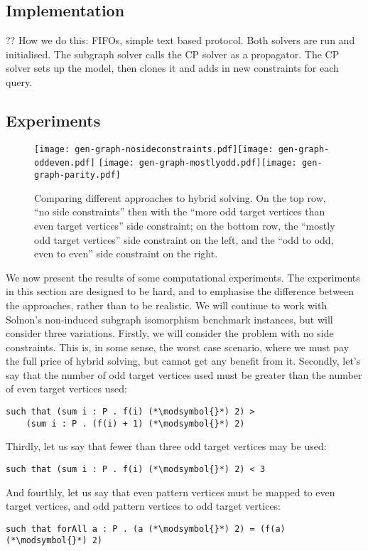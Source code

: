 \documentclass[runningheads]{llncs}
\begin{document}
\subsection{Implementation}

?? How we do this: FIFOs, simple text based protocol. Both solvers are run and initialised. The
subgraph solver calls the CP solver as a propagator. The CP solver sets up the model, then clones it
and adds in new constraints for each query.

\subsection{Experiments}

\begin{figure}[p]
    \texttt{[image: gen-graph-nosideconstraints.pdf]}\hfill\texttt{[image: gen-graph-oddeven.pdf]}
    \bigskip
    \texttt{[image: gen-graph-mostlyodd.pdf]}\hfill\texttt{[image: gen-graph-parity.pdf]}
    \caption{Comparing different approaches to hybrid solving. On the top row, ``no side
    constraints'' then with the ``more odd target vertices than even target vertices'' side
    constraint; on the bottom row, the ``mostly odd target vertices'' side constraint on the left,
    and the ``odd to odd, even to even'' side constraint on the right.}\label{figure:cumulative}
\end{figure}

We now present the results of some computational experiments. The experiments in this section are
designed to be hard, and to emphasise the difference between the approaches, rather than to be
realistic. We will continue to work with Solnon's non-induced subgraph isomorphism benchmark
instances, but will consider three variations. Firstly, we will consider the problem with no side
constraints. This is, in some sense, the worst case scenario, where we must pay the full price of
hybrid solving, but cannot get any benefit from it. Secondly, let's say that the number of odd
target vertices used must be greater than the number of even target vertices used:
\newcommand{\modsymbol}{\%}
\begin{lstlisting}
such that (sum i : P . f(i) (*\modsymbol{}*) 2) >
    (sum i : P . (f(i) + 1) (*\modsymbol{}*) 2)
\end{lstlisting}
Thirdly, let us say that fewer than three odd target vertices may be used:
\begin{lstlisting}
such that (sum i : P . f(i) (*\modsymbol{}*) 2) < 3
\end{lstlisting}
And fourthly, let us say that even pattern vertices must be mapped to even target vertices, and odd
pattern vertices to odd target vertices:
\begin{lstlisting}
such that forAll a : P . (a (*\modsymbol{}*) 2) = (f(a) (*\modsymbol{}*) 2)
\end{lstlisting}
\end{document}
